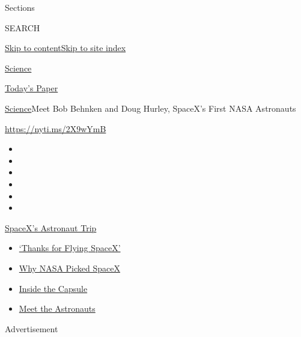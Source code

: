 Sections

SEARCH

\protect\hyperlink{site-content}{Skip to
content}\protect\hyperlink{site-index}{Skip to site index}

\href{https://www.nytimes.com/section/science}{Science}

\href{https://myaccount.nytimes.com/auth/login?response_type=cookie\&client_id=vi}{}

\href{https://www.nytimes.com/section/todayspaper}{Today's Paper}

\href{/section/science}{Science}\textbar{}Meet Bob Behnken and Doug
Hurley, SpaceX's First NASA Astronauts

\url{https://nyti.ms/2X9wYmB}

\begin{itemize}
\item
\item
\item
\item
\item
\item
\end{itemize}

\href{https://www.nytimes.com/2020/08/02/science/spacex-astronauts-splashdown.html?action=click\&pgtype=Article\&state=default\&region=TOP_BANNER\&context=storylines_menu}{SpaceX's
Astronaut Trip}

\begin{itemize}
\tightlist
\item
  \href{https://www.nytimes.com/2020/08/02/science/spacex-astronauts-splashdown.html?action=click\&pgtype=Article\&state=default\&region=TOP_BANNER\&context=storylines_menu}{`Thanks
  for Flying SpaceX'}
\item
  \href{https://www.nytimes.com/2020/05/26/science/spacex-launch-nasa.html?action=click\&pgtype=Article\&state=default\&region=TOP_BANNER\&context=storylines_menu}{Why
  NASA Picked SpaceX}
\item
  \href{https://www.nytimes.com/interactive/2020/05/26/science/spacex-nasa.html?action=click\&pgtype=Article\&state=default\&region=TOP_BANNER\&context=storylines_menu}{Inside
  the Capsule}
\item
  \href{https://www.nytimes.com/2020/05/27/science/bob-behnken-doug-hurley.html?action=click\&pgtype=Article\&state=default\&region=TOP_BANNER\&context=storylines_menu}{Meet
  the Astronauts}
\end{itemize}

Advertisement

